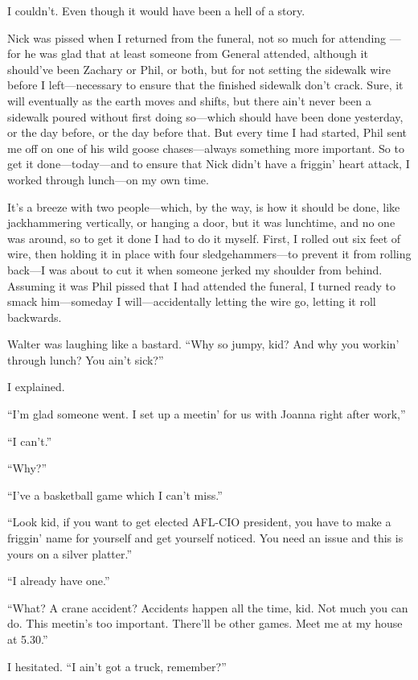 I couldn't. Even though it would have been a hell of a story.

Nick was pissed when I returned from the funeral, not so much for
attending ---for he was glad that at least someone from General
attended, although it should've been Zachary or Phil, or both, but for
not setting the sidewalk wire before I left---necessary to ensure that
the finished sidewalk don't crack. Sure, it will eventually as the earth
moves and shifts, but there ain't never been a sidewalk poured without
first doing so---which should have been done yesterday, or the day
before, or the day before that. But every time I had started, Phil sent
me off on one of his wild goose chases---always something more
important. So to get it done---today---and to ensure that Nick didn't
have a friggin' heart attack, I worked through lunch---on my own time.

It's a breeze with two people---which, by the way, is how it should be
done, like jackhammering vertically, or hanging a door, but it was
lunchtime, and no one was around, so to get it done I had to do it
myself. First, I rolled out six feet of wire, then holding it in place
with four sledgehammers---to prevent it from rolling back---I was about
to cut it when someone jerked my shoulder from behind. Assuming it was
Phil pissed that I had attended the funeral, I turned ready to smack
him---someday I will---accidentally letting the wire go, letting it roll
backwards.

Walter was laughing like a bastard. ``Why so jumpy, kid? And why you
workin' through lunch? You ain't sick?''

I explained.

``I'm glad someone went. I set up a meetin' for us with Joanna right
after work,''

``I can't.''

``Why?''

``I've a basketball game which I can't miss.''

``Look kid, if you want to get elected AFL-CIO president, you have to
make a friggin' name for yourself and get yourself noticed. You need an
issue and this is yours on a silver platter.''

``I already have one.''

``What? A crane accident? Accidents happen all the time, kid. Not much
you can do. This meetin's too important. There'll be other games. Meet
me at my house at 5.30.''

I hesitated. ``I ain't got a truck, remember?''

